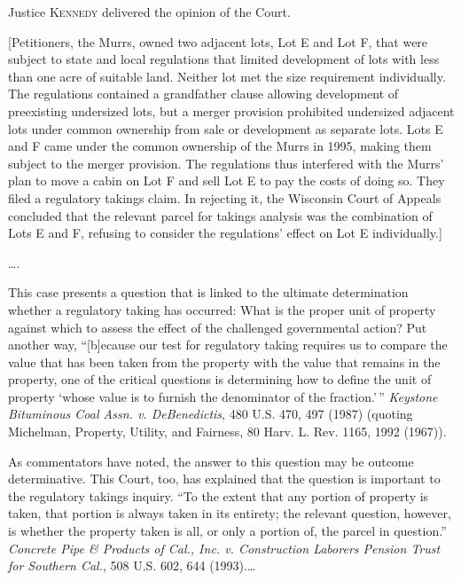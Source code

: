 

\opinion Justice \textsc{Kennedy} delivered the opinion of the Court.

[Petitioners, the Murrs, owned two adjacent lots, Lot E and Lot F, that were
subject to state and local regulations that limited development of lots with
less than one acre of suitable land. Neither lot met the size requirement
individually. The regulations contained a grandfather clause allowing
development of preexisting undersized lots, but a merger provision prohibited
undersized adjacent lots under common ownership from sale or development as
separate lots. Lots E and F came under the common ownership of the Murrs in
1995, making them subject to the merger provision. The regulations thus
interfered with the Murrs' plan to move a cabin on Lot F and sell Lot E to pay
the costs of doing so. They filed a regulatory takings claim. In rejecting it,
the Wisconsin Court of Appeals concluded that the relevant parcel for takings
analysis was the combination of Lots E and F, refusing to consider the
regulations' effect on Lot E individually.]

\ldots.

This case presents a question that is linked to the ultimate determination
whether a regulatory taking has occurred: What is the proper unit of property
against which to assess the effect of the challenged governmental action? Put
another way, ``[b]ecause our test for regulatory taking requires us to compare
the value that has been taken from the property with the value that remains in
the property, one of the critical questions is determining how to define the
unit of property `whose value is to furnish the denominator of the
fraction.'\,'' \textit{Keystone Bituminous Coal Assn. v. DeBenedictis}, 480 U.S.
470, 497 (1987) (quoting Michelman, Property, Utility, and Fairness, 80 Harv. L.
Rev. 1165, 1992 (1967)).

As commentators have noted, the answer to this question may be outcome
determinative. This Court, too, has explained that the question is important to
the regulatory takings inquiry. ``To the extent that any portion of property is
taken, that portion is always taken in its entirety; the relevant question,
however, is whether the property taken is all, or only a portion of, the parcel
in question.'' \textit{Concrete Pipe \& Products of Cal., Inc. v. Construction
Laborers Pension Trust for Southern Cal.}, 508 U.S. 602, 644 (1993).\ldots

